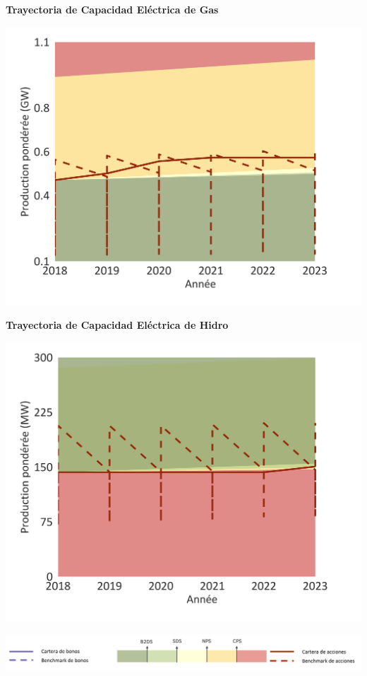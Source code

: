 \documentclass[10pt,table]{article}\usepackage[]{graphicx}\usepackage[]{color}
\begin{document}
	\begin{minipage}[t]{.49\textwidth}
		\textbf{Trayectoria de Capacidad Eléctrica de Gas }
		
		\includegraphics[trim = {0 0cm 0 0},width=1\linewidth]{ReportOutputs/Fig19}
		
		\textbf{Trayectoria de Capacidad Eléctrica de Hidro}
		
		\includegraphics[trim = {0 0cm 0 0},width=1\linewidth]{ReportOutputs/Fig20}
		
	\end{minipage}
	
	\vspace{-0.6cm}
	\begin{center}
		\includegraphics[trim = {0 0cm 0 0},width=.9\linewidth]{ReportGraphics/246Legend_ES.png}
	\end{center}
\end{document}
